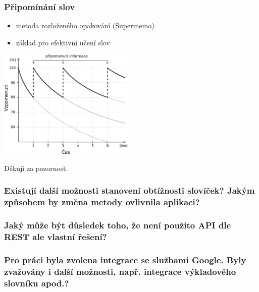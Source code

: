 \begin{frame}[t]
    \frametitle{Připomínání slov}
    \begin{itemize}
        \item metoda rozloženého opakování (Supermemo)
        \item základ pro efektivní učení slov
    \end{itemize}
    \begin{center}
        \includegraphics[width=6.5cm]{./img/forgetting-curve.pdf}\\
    \end{center}
\end{frame}

\begin{frame}
\begin{center}
\label{lastslide}
\huge Děkuji za pozornost.
\end{center}
\end{frame}

\begin{frame}[noframenumbering]
\begin{center}
    \frametitle{Existují další možnosti stanovení obtížnosti slovíček? Jakým způsobem by změna metody ovlivnila aplikaci?}
    
\end{center}
\end{frame}

\begin{frame}[noframenumbering]
\begin{center}
    \frametitle{Jaký může být důsledek toho, že není použito API dle REST ale vlastní řešení?}
    
\end{center}
\end{frame}

\begin{frame}[noframenumbering]
\begin{center}
    \frametitle{Pro práci byla zvolena integrace se službami Google. Byly zvažovány i další možnosti, např. integrace výkladového slovníku apod.?}
    
\end{center}
\end{frame}


